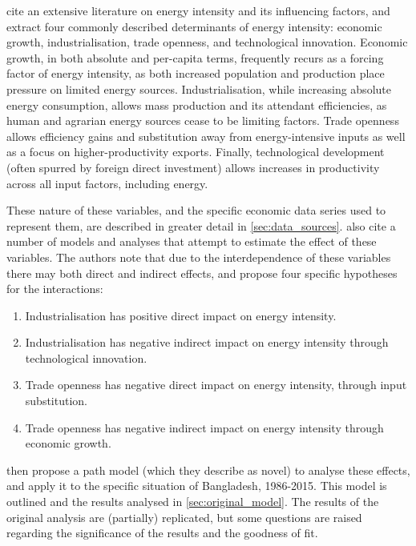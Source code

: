 \documentclass[11pt,a4paper]{article}
\begin{document}
\cite{panHowIndustrializationTrade2019} cite an extensive literature on energy intensity and its influencing factors, and extract four commonly described determinants of energy intensity: economic growth, industrialisation, trade openness, and technological innovation.
Economic growth, in both absolute and per-capita terms, frequently recurs as a forcing factor of energy intensity, as both increased population and production place pressure on limited energy sources.
Industrialisation, while increasing absolute energy consumption, allows mass production and its attendant efficiencies, as human and agrarian energy sources cease to be limiting factors.
Trade openness allows efficiency gains and substitution away from energy-intensive inputs as well as a focus on higher-productivity exports. 
Finally, technological development (often spurred by foreign direct investment) allows increases in productivity across all input factors, including energy.

These nature of these variables, and the specific economic data series used to represent them, are described in greater detail in \cref{sec:data_sources}.
\cite{panHowIndustrializationTrade2019} also cite a number of models and analyses that attempt to estimate the effect of these variables. 
The authors note that due to the interdependence of these variables there may both direct and indirect effects, and propose four specific hypotheses for the interactions:
\begin{enumerate}[label=\textbf{H.\arabic*}]
\item Industrialisation has positive direct impact on energy intensity. 
\item Industrialisation has negative indirect impact on energy intensity through technological innovation.
\item Trade openness has negative direct impact on energy intensity, through input substitution.
\item Trade openness has negative indirect impact on energy intensity through economic growth.
\end{enumerate}

\cite{panHowIndustrializationTrade2019} then propose a path model (which they describe as novel) to analyse these effects, and apply it to the specific situation of Bangladesh, 1986-2015.
This model is outlined and the results analysed in \cref{sec:original_model}.
The results of the original analysis are (partially) replicated, but some questions are raised regarding the significance of the results and the goodness of fit.
\end{document}
